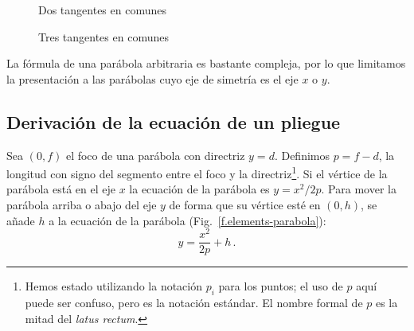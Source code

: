 \begin{figure}[t]
\begin{minipage}{.45\textwidth}
\begin{center}
\caption{Dos tangentes en comunes}\label{f.two-para-1-two}
\end{center}
\end{minipage}
\hfill
\begin{minipage}{.45\textwidth}
\begin{center}
\caption{Tres tangentes en comunes}\label{f.two-para-1-three}
\end{center}
\end{minipage}
\end{figure}

La fórmula de una parábola arbitraria es bastante compleja, por lo que limitamos la presentación a las parábolas cuyo eje de simetría es el eje $x$ o $y$.

\subsection{Derivación de la ecuación de un pliegue}

Sea $(0,f)$ el foco de una parábola con directriz $y=d$. Definimos $p=f-d$, la longitud con signo del segmento entre el foco y la directriz\footnote{Hemos estado utilizando la notación $p_i$ para los puntos; el uso de $p$ aquí puede ser confuso, pero es la notación estándar. El nombre formal de $p$ es la mitad del \emph{latus rectum}.}. Si el vértice de la parábola está en el eje $x$ la ecuación de la parábola es $y=x^2/2p$. Para mover la parábola arriba o abajo del eje $y$ de forma que su vértice esté en $(0,h)$, se añade $h$ a la ecuación de la parábola (Fig.~\ref{f.elements-parabola}):
\[y=\frac{x^2}{2p}+h\,.\]

